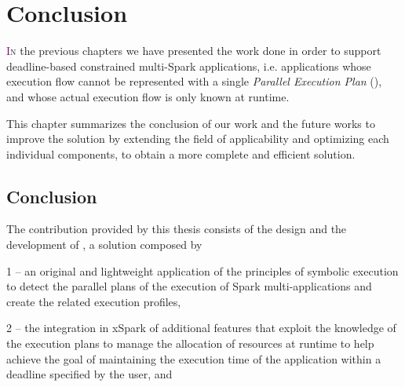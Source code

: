 \chapter{Conclusion} \label{chap:conclusion}
\lettrine[lines=4]{\textcolor{purple}{I}}{n} the previous chapters we have presented the work done in order to support deadline-based \qos constrained multi-\plan Spark applications, i.e. applications whose execution flow cannot be represented with a single \textit{Parallel Execution Plan} (\plan), and whose actual execution flow is only known at runtime. 

This chapter summarizes the conclusion of our work and the future works to improve the solution by extending the field of applicability and optimizing each  individual components, to obtain a more complete and efficient solution.

\section{Conclusion}\label{sec:conclusion}


The contribution provided by this thesis consists of the design and the development of \tool, a solution composed by 

1 -- an original and lightweight application of the principles of symbolic execution to detect the parallel plans of the execution of Spark multi-\plan applications and  create the related execution profiles, 

2 -- the integration in xSpark of additional features that exploit the knowledge of the execution plans to manage the allocation of resources at runtime to help achieve the goal of maintaining the execution time of the application within a deadline specified by the user, and 

